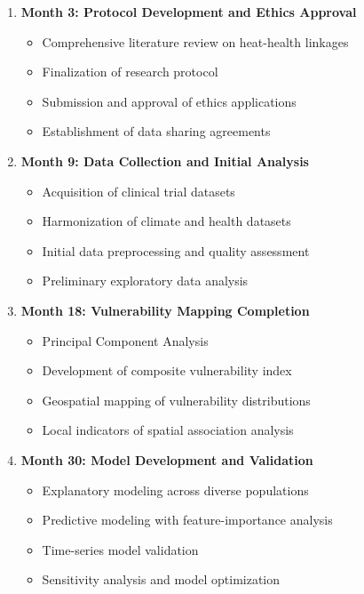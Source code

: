 \graphicspath{{./}{./sections/images/}{./images/}}\documentclass[12pt,a4paper,landscape]{article}
\begin{document}
\begin{enumerate}[leftmargin=*, itemsep=0.5em]
    \item \textbf{Month 3: Protocol Development and Ethics Approval}
    \begin{itemize}[leftmargin=*]
        \item Comprehensive literature review on heat-health linkages
        \item Finalization of research protocol
        \item Submission and approval of ethics applications
        \item Establishment of data sharing agreements
    \end{itemize}
    
    \item \textbf{Month 9: Data Collection and Initial Analysis}
    \begin{itemize}[leftmargin=*]
        \item Acquisition of clinical trial datasets
        \item Harmonization of climate and health datasets
        \item Initial data preprocessing and quality assessment
        \item Preliminary exploratory data analysis
    \end{itemize}
    
    \item \textbf{Month 18: Vulnerability Mapping Completion}
    \begin{itemize}[leftmargin=*]
        \item Principal Component Analysis
        \item Development of composite vulnerability index
        \item Geospatial mapping of vulnerability distributions
        \item Local indicators of spatial association analysis
    \end{itemize}
    
    \item \textbf{Month 30: Model Development and Validation}
    \begin{itemize}[leftmargin=*]
        \item Explanatory modeling across diverse populations
        \item Predictive modeling with feature-importance analysis
        \item Time-series model validation
        \item Sensitivity analysis and model optimization
    \end{itemize}
    

\end{enumerate}
\end{document}
